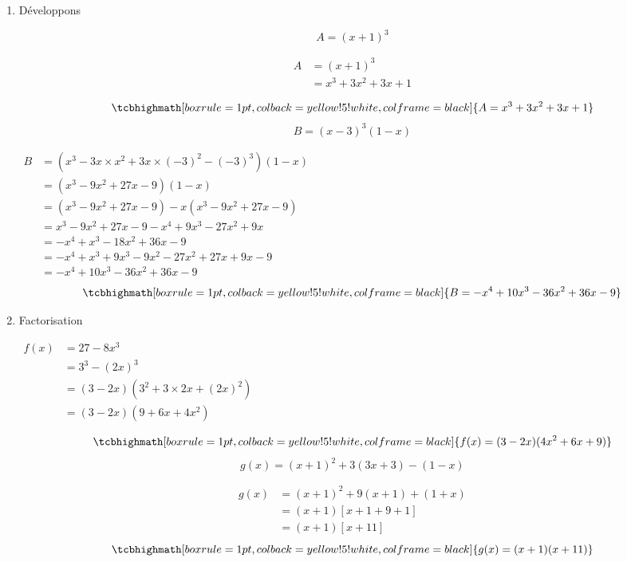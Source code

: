 \documentclass[12pt,a4paper]{article}
\begin{document}
\begin{enumerate}
    \item Développons
    
\[
A = (x + 1)^3
\]

\[
\begin{aligned}
A &= (x + 1)^3 \\
  &= x^3 + 3x^2 + 3x + 1 
\end{aligned}
\]

\[
\tcbhighmath[boxrule=1pt, colback=yellow!5!white, colframe=black]{ A = x^3 + 3x^2 + 3x + 1 }
\]
\[
B = (x - 3)^3 (1 - x)
\]


    $    
    \begin{aligned}
        B &= (x^3 - 3x \times x^2 + 3x \times (-3)^2 - (-3)^3)(1 - x) \\
        &= (x^3 - 9x^2 + 27x - 9)(1 - x) \\
        &= (x^3 - 9x^2 + 27x - 9) - x(x^3 - 9x^2 + 27x - 9) \\
        &= x^3 - 9x^2 + 27x - 9 - x^4 + 9x^3 - 27x^2 + 9x \\
        &= -x^4 + x^3 - 18x^2 + 36x - 9\\
         &= -x^4 + x^3 + 9x^3 - 9x^2 - 27x^2 + 27x + 9x - 9 \\
         &= -x^4 + 10x^3 - 36x^2 + 36x - 9
    \end{aligned}
    $
\[
\tcbhighmath[boxrule=1pt, colback=yellow!5!white, colframe=black]{ B=-x^4 + 10x^3 - 36x^2 + 36x - 9 }
\]
    \item Factorisation


    $
    \begin{aligned}
        f(x) &= 27 - 8x^3 \\
        &= 3^3 - (2x)^3 \\
        &= (3 - 2x) (3^2 + 3 \times 2x + (2x)^2) \\
        &= (3 - 2x)(9 + 6x + 4x^2)
    \end{aligned}
    $

\[
\tcbhighmath[boxrule=1pt, colback=yellow!5!white, colframe=black]{ f(x) = (3 - 2x)(4x^2 + 6x + 9) }
\]
\[
g(x) = (x + 1)^2 + 3(3x + 3) - (1 - x)
\]

\[
\begin{aligned}
g(x) &= (x + 1)^2 + 9(x + 1) + (1 + x) \\
     &= (x + 1) \left[x + 1 + 9 + 1\right] \\
     &= (x + 1) \left[x + 11\right]
\end{aligned}
\]
\[
\tcbhighmath[boxrule=1pt, colback=yellow!5!white, colframe=black]{ g(x) = (x + 1)(x + 11) }
\]
\end{enumerate}
\end{document}

